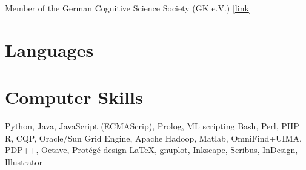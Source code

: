 \documentclass[11pt,a4paper]{moderncv}
\begin{document}
        {Member of the German Cognitive Science Society (GK e.V.)}
        {}
        {}
        {[\href{http://www.gk-ev.de}{link}]}
        {}
\closesection{}


\section{Languages}
\closesection{}


\section{Computer Skills}
        {Python, Java, JavaScript (ECMA\-Scrip), Prolog, ML}
    {scripting}
        {Bash, Perl, PHP}
        {R, CQP, Oracle/Sun Grid Engine, Apache Hadoop, Matlab, OmniFind+UIMA,
        PDP++, Octave, Prot\'{e}g\'{e}}
    {design}
        {\LaTeX, gnuplot, Inkscape, Scribus, InDesign, Illustrator}%
\closesection{}

\end{document}
